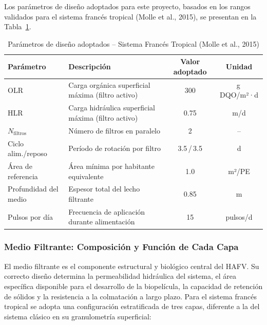 \documentclass[12pt,a4paper]{article}
\begin{document}
Los parámetros de diseño adoptados para este proyecto, basados en los rangos validados para el sistema francés tropical (Molle et al., 2015), se presentan en la Tabla~\ref{tab:parametros_frances}.

\begin{table}[H]
\centering
\caption{Parámetros de diseño adoptados -- Sistema Francés Tropical (Molle et al., 2015)}
\label{tab:parametros_frances}
\begin{tabular}{p{5.0cm}p{5.2cm}cc}
\toprule
\textbf{Parámetro} & \textbf{Descripción} & \textbf{Valor adoptado} & \textbf{Unidad} \\
\midrule
OLR & Carga orgánica superficial máxima (filtro activo) & 300 & g\,DQO/m²·d \\
HLR & Carga hidráulica superficial máxima (filtro activo) & 0.75 & m/d \\
$N_\text{filtros}$ & Número de filtros en paralelo & 2 & -- \\
Ciclo alim./reposo & Período de rotación por filtro & 3.5\,/\,3.5 & d \\
Área de referencia & Área mínima por habitante equivalente & 1.0 & m²/PE \\
Profundidad del medio & Espesor total del lecho filtrante & 0.85 & m \\
Pulsos por día & Frecuencia de aplicación durante alimentación & 15 & pulsos/d \\
\bottomrule
\end{tabular}
\end{table}

\subsubsection*{Medio Filtrante: Composición y Función de Cada Capa}

El medio filtrante es el componente estructural y biológico central del HAFV. Su correcto diseño determina la permeabilidad hidráulica del sistema, el área específica disponible para el desarrollo de la biopelícula, la capacidad de retención de sólidos y la resistencia a la colmatación a largo plazo. Para el sistema francés tropical se adopta una configuración estratificada de tres capas, diferente a la del sistema clásico en su granulometría superficial:
\end{document}

